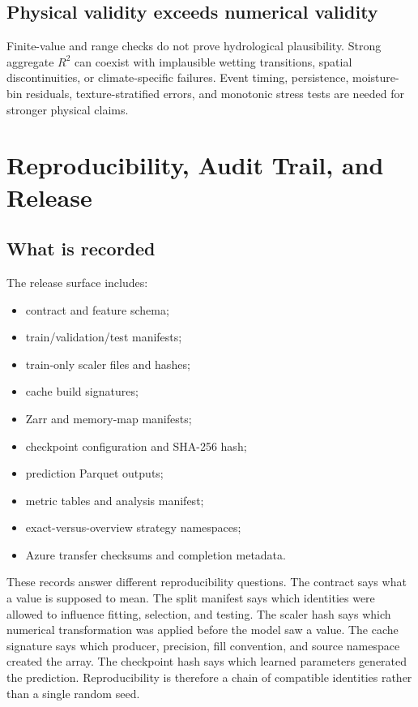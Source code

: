 \documentclass[12pt,a4paper]{report}
\begin{document}
\subsection{Physical validity exceeds numerical validity}
Finite-value and range checks do not prove hydrological plausibility. Strong
aggregate $R^2$ can coexist with implausible wetting transitions, spatial
discontinuities, or climate-specific failures. Event timing, persistence,
moisture-bin residuals, texture-stratified errors, and monotonic stress tests
are needed for stronger physical claims.

\section{Reproducibility, Audit Trail, and Release}

\subsection{What is recorded}
The release surface includes:
\begin{itemize}
    \item contract and feature schema;
    \item train/validation/test manifests;
    \item train-only scaler files and hashes;
    \item cache build signatures;
    \item Zarr and memory-map manifests;
    \item checkpoint configuration and SHA-256 hash;
    \item prediction Parquet outputs;
    \item metric tables and analysis manifest;
    \item exact-versus-overview strategy namespaces;
    \item Azure transfer checksums and completion metadata.
\end{itemize}

These records answer different reproducibility questions. The contract says
what a value is supposed to mean. The split manifest says which identities were
allowed to influence fitting, selection, and testing. The scaler hash says
which numerical transformation was applied before the model saw a value. The
cache signature says which producer, precision, fill convention, and source
namespace created the array. The checkpoint hash says which learned parameters
generated the prediction. Reproducibility is therefore a chain of compatible
identities rather than a single random seed.
\end{document}
